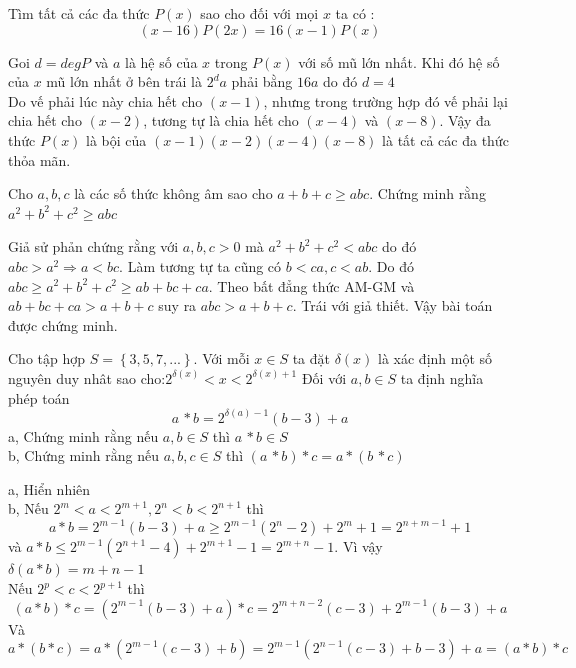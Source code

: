 \begin{baitap}
Tìm tất cả các đa thức $P(x)$ sao cho đối với mọi $x$ ta có : $$\left( {x - 16} \right)P\left( {2x} \right) = 16\left( {x - 1} \right)P\left( x \right)$$

\begin{loigiai1}

Goi $d=degP$ và $a$ là hệ số của $x$ trong $P(x)$ với số mũ lớn nhất. Khi đó hệ số của $x$ mũ lớn nhất ở bên trái là $2^d a$ phải bằng $16a$ do đó $d=4$\\
Do vế phải lúc này chia hết cho $(x-1)$, nhưng trong trường hợp đó vế phải lại chia hết cho $(x-2)$, tương tự là chia hết cho $(x-4)$ và $(x-8)$. Vậy đa thức $P(x)$ là bội của $(x-1)(x-2)(x-4)(x-8)$ là tất cả các đa thức thỏa mãn.
\end{loigiai1}
\end{baitap}


\begin{baitap}
Cho $a,b,c $ là các số thức không âm sao cho $a + b + c \ge abc$. Chứng minh rằng $a^2  + b^2  + c^2  \ge abc$

\begin{loigiai1}
Giả sử phản chứng rằng với $a,b,c>0$ mà $a^2+b^2+c^2<abc$ do đó $abc>a^2 \Rightarrow a<bc$. Làm tương tự ta cũng có $b<ca, c<ab$. Do đó $abc\ge a^2+b^2+c^2\ge ab+bc+ca$. Theo bất đẳng thức AM-GM và $ab+bc+ca>a+b+c $ suy ra $abc>a+b+c$. Trái với giả thiết. Vậy bài toán được chứng minh.
\end{loigiai1}
\end{baitap}

\begin{baitap}
Cho tập hợp $S = \left\{ {3,5,7,...} \right\}$. Với mỗi $x \in S$ ta đặt $\delta (x)$ là xác định một số nguyên duy nhât sao cho:\quad$2^{\delta (x)}  < x < 2^{\delta (x) + 1} $
Đối với $a,b \in S$ ta định nghĩa phép toán
$$ a\, * b = 2^{\delta (a) - 1} \left( {b - 3} \right) + a $$
a, Chứng minh rằng nếu $a,b \in S$  thì $a\, * b \in S$\\
b, Chứng minh rằng nếu $a,b,c \in S$ thì $\left( {a\, * b} \right) * c = a * \left( {b\, * c} \right)$


\begin{loigiai1}
\noindent
a, Hiển nhiên\\
b, Nếu $2^m  < a < 2^{m + 1}, 2^n  < b < 2^{n + 1}$  thì 
$$ a * b = 2^{m - 1} \left( {b - 3} \right) + a \ge 2^{m - 1} \left( {2^n  - 2} \right) + 2^m  + 1 = 2^{n + m - 1}  + 1 $$
và $a * b \le 2^{m - 1} \left( {2^{n + 1}  - 4} \right) + 2^{m + 1}  - 1 = 2^{m + n}  - 1$. Vì vậy $\delta (a * b) = m + n - 1$\\
Nếu $2^p  < c < 2^{p + 1} $ thì \\$$\left( {a * b} \right) * c = \left( {2^{m - 1} \left( {b - 3} \right) + a} \right) * c = 2^{m + n - 2} \left( {c - 3} \right) + 2^{m - 1} (b - 3) + a$$
Và$$ a * \left( {b * c} \right) = a * \left( {2^{m - 1} \left( {c - 3} \right) + b} \right) = 2^{m - 1} \left( {2^{n - 1} (c - 3) + b - 3} \right) + a = \left( {a * b} \right) * c $$

\end{loigiai1}
\end{baitap}


